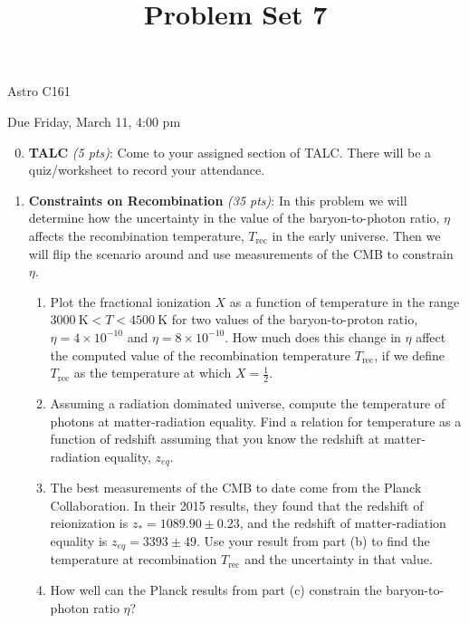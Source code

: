 \documentclass[12pt,preprint]{aastex}
\title{Problem Set 7}
\def\K{\mathrm{K}}
\newcommand\sn[2]{#1 \times 10^{#2}}
\def\half{\frac{1}{2}}
\def\Trec{T_{\mathrm{rec}}}
\begin{document}
\maketitle
\centerline{Astro C161} 

\centerline{Due Friday, March 11, 4:00 pm}

\begin{enumerate}
\setcounter{enumi}{-1}

\item \textbf{TALC} \textit{(5 pts)}: Come to your assigned section of TALC. There will be a quiz/worksheet to record your attendance.

\item \textbf{Constraints on Recombination} \textit{(35 pts)}: In this problem we will determine how the uncertainty in the value of the baryon-to-photon ratio, $\eta$ affects the recombination temperature, $\Trec$ in the early universe. Then we will flip the scenario around and use measurements of the CMB to constrain $\eta$. 
	\begin{enumerate}
	\item Plot the fractional ionization $X$ as a function of temperature in the range $3000\ \K < T < 4500\ \K$ for two values of the baryon-to-proton ratio, $\eta = \sn{4}{-10}$ and $\eta = \sn{8}{-10}$. How much does this change in $\eta$ affect the computed value of the recombination temperature $\Trec$, if we define $\Trec$ as the temperature at which $X = \half$. 
	\item Assuming a radiation dominated universe, compute the temperature of photons at matter-radiation equality. Find a relation for temperature as a function of redshift assuming that you know the redshift at matter-radiation equality, $z_{eq}$. 
	\item The best measurements of the CMB to date come from the Planck Collaboration. In their 2015 results, they found that the redshift of reionization is $z_* = 1089.90 \pm 0.23$, and the redshift of matter-radiation equality is $z_{eq} =  3393 \pm 49$. Use your result from part (b) to find the temperature at recombination $\Trec$ and the uncertainty in that value. 
	\item How well can the Planck results from part (c) constrain the baryon-to-photon ratio $\eta$?
	\end{enumerate}


\end{enumerate}
\end{document}
